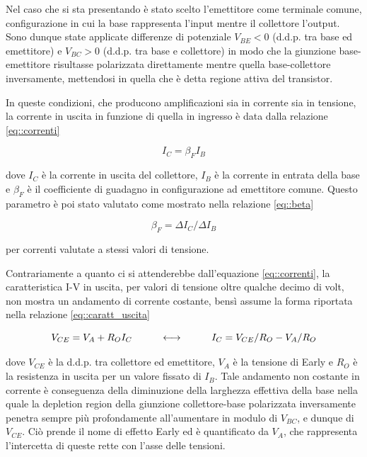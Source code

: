\documentclass[a4paper,11pt]{article}
\begin{document}
Nel caso che si sta presentando è stato scelto l'emettitore come terminale comune, configurazione in cui la base rappresenta l'input mentre il collettore l'output. Sono dunque state applicate differenze di potenziale $V_{BE} < 0$ (d.d.p. tra base ed emettitore) e $V_{BC} > 0$ (d.d.p. tra base e collettore) in modo che la giunzione base-emettitore risultasse polarizzata direttamente mentre quella base-collettore inversamente, mettendosi in quella che è detta regione attiva del transistor.

In queste condizioni, che producono amplificazioni sia in corrente sia in tensione, la corrente in uscita in funzione di quella in ingresso è data dalla relazione \ref{eq::correnti}

\begin{equation}
I_C = \beta_F I_B
\label{eq::correnti}
\end{equation}

dove $I_C$ è la corrente in uscita del collettore, $I_B$ è la corrente in entrata della base e $\beta_F$ è il coefficiente di guadagno in configurazione ad emettitore comune. Questo parametro è poi stato valutato come mostrato nella relazione \ref{eq::beta}

\begin{equation}
    \label{eq::beta}
\beta_F = \Delta I_C / \Delta I_B
\end{equation}

per correnti valutate a stessi valori di tensione.

Contrariamente a quanto ci si attenderebbe dall'equazione \ref{eq::correnti}, la caratteristica I-V in uscita, per valori di tensione oltre qualche decimo di volt, non mostra un andamento di corrente costante, bensì assume la forma riportata nella relazione \ref{eq::caratt_uscita} %

\begin{equation}
    \label{eq::caratt_uscita}
    V_{CE} = V_A + R_O I_C \hspace{10mm} \longleftrightarrow  \hspace{10mm} I_C = V_{CE}/R_O - V_A/R_O
\end{equation}

dove $V_{CE}$ è la d.d.p. tra collettore ed emettitore, $V_A$ è la tensione di Early e $R_O$ è la resistenza in uscita per un valore fissato di $I_B$. Tale andamento non costante in corrente è conseguenza della diminuzione della larghezza effettiva della base nella quale la depletion region della giunzione collettore-base polarizzata inversamente penetra sempre più profondamente all'aumentare in modulo di $V_{BC}$, e dunque di $V_{CE}$. Ciò prende il nome di effetto Early ed è quantificato da $V_A$, che rappresenta l'intercetta di queste rette con l'asse delle tensioni.
\end{document}
